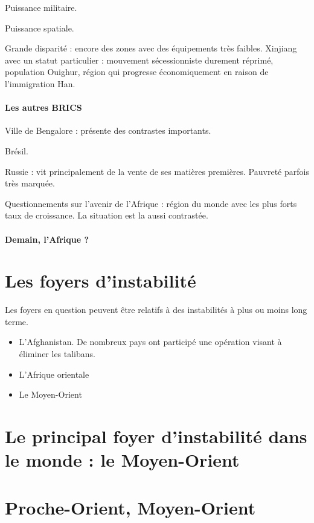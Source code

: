 \documentclass[a4paper,10pt]{article}
\begin{document}
		Puissance militaire.

		Puissance spatiale.

		Grande disparité : encore des zones avec des équipements très faibles.
		Xinjiang avec un statut particulier : mouvement sécessionniste durement réprimé, population Ouighur, région qui progresse économiquement en raison de l'immigration Han.

		\paragraph{Les autres BRICS}

		Ville de Bengalore : présente des contrastes importants.

		Brésil.

		Russie : vit principalement de la vente de ses matières premières.
		Pauvreté parfois très marquée.

		Questionnements sur l'avenir de l'Afrique : région du monde avec les plus forts taux de croissance.
		La situation est la aussi contrastée.

		\paragraph{Demain, l’Afrique ?}

\section{Les foyers d'instabilité}

		Les foyers en question peuvent être relatifs à des instabilités à plus ou moins long terme.

		\begin{itemize}
		\item L'Afghanistan. De nombreux pays ont participé une opération visant à éliminer les talibans.
		\item L'Afrique orientale
		\item Le Moyen-Orient
		\end{itemize}

\section{Le principal foyer d'instabilité dans le monde : le Moyen-Orient}

	\section{Proche-Orient, Moyen-Orient}
\end{document}
